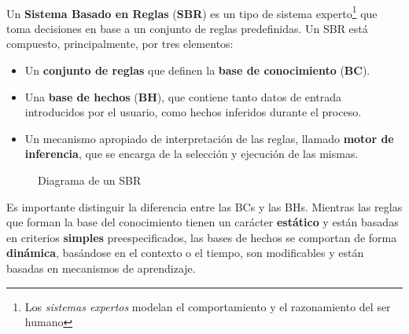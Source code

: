 \documentclass[a4paper,11pt, includehead]{article}
\title{
	\vspace{-5ex}
	{\large \textsc{\subject}}\\[1ex]
	\hrule
	\vspace{3ex}
	{\huge \textsc{\underline{Sistemas Basados en Reglas: Cuestiones}}}\\[2ex]
	{\small Hugo Sánchez Martínez\\[-2ex]
	\texttt{hugo.s.m@um.es}} %
	
	\vspace{2ex}
	\hrule
	\vspace{2ex}
	{\normalsize \textsc{Facultad de Informática - Universidad de Murcia}\\[-1ex] Diciembre 2024}
	}
\date{} %
\begin{document}
	
\maketitle %

\pagestyle{fancy}

\fancyhf{} %
\fancyfoot[R]{\thepage}
\setlength{\headsep}{4ex}

\setcounter{page}{1}

\\

Un \textbf{Sistema Basado en Reglas} (\textbf{SBR}) es un tipo de sistema experto\footnote{Los \textit{sistemas expertos} modelan el comportamiento y el razonamiento del ser humano} que toma decisiones en base a un conjunto de reglas predefinidas. Un SBR está compuesto, principalmente, por tres elementos: 
\begin{itemize}
	\item Un \textbf{conjunto de reglas} que definen la \textbf{base de conocimiento} (\textbf{BC}).
	\item Una \textbf{base de hechos} (\textbf{BH}), que contiene tanto datos de entrada introducidos por el usuario, como hechos inferidos durante el proceso.
	\item Un mecanismo apropiado de interpretación de las reglas, llamado \textbf{motor de inferencia}, que se encarga de la selección y ejecución de las mismas.
\end{itemize}

\vspace{2ex}

\begin{figure}[h]
	\centering
	\scalebox{0.9}{}
	\caption{Diagrama de un SBR}
	\label{fig:diagramaSBR}
\end{figure}

\vspace{2ex}

Es importante distinguir la diferencia entre las BCs y las BHs. Mientras las reglas que forman la base del conocimiento tienen un carácter \textbf{estático} y están basadas en criterios \textbf{simples} preespecificados, las bases de hechos se comportan de forma \textbf{dinámica}, basándose en el contexto o el tiempo, son modificables y están basadas en mecanismos de aprendizaje.\cite{udg_arl4_8}\\
\end{document}
